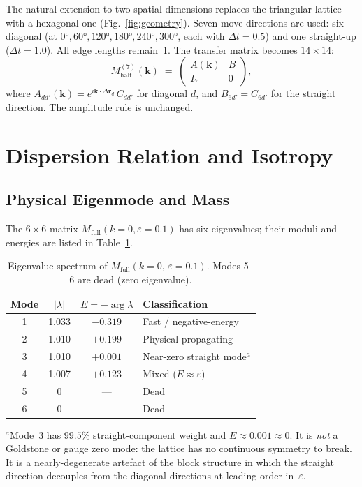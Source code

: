 \documentclass[twocolumn,showpacs,preprintnumbers,amsmath,amssymb]{revtex4-2}
\newcommand{\eps}{\varepsilon}
\begin{document}
The natural extension to two spatial dimensions replaces the triangular lattice
with a hexagonal one (Fig.~\ref{fig:geometry}).
Seven move directions are used: six diagonal (at $0°, 60°, 120°, 180°, 240°,
300°$, each with $\Delta t = 0.5$) and one straight-up ($\Delta t = 1.0$).
All edge lengths remain~1.  The transfer matrix becomes $14\times 14$:
\begin{equation}
  M_{\mathrm{half}}^{(7)}(\mathbf{k}) \;=\;
  \begin{pmatrix} A(\mathbf{k}) & B \\ I_7 & 0 \end{pmatrix},
  \label{eq:TM14}
\end{equation}
where $A_{dd'}(\mathbf{k}) = e^{i\mathbf{k}\cdot\Delta\mathbf{r}_d}\,C_{dd'}$
for diagonal $d$, and $B_{6d'} = C_{6d'}$ for the straight direction.
The amplitude rule is unchanged.

\section{Dispersion Relation and Isotropy}
\label{sec:dispersion}

\subsection{Physical Eigenmode and Mass}

The $6\times 6$ matrix $M_{\mathrm{full}}(k{=}0, \eps{=}0.1)$ has six
eigenvalues; their moduli and energies are listed in
Table~\ref{tab:spectrum}.

\begin{table}[t]
\caption{Eigenvalue spectrum of $M_{\mathrm{full}}(k{=}0,\,\eps{=}0.1)$.
Modes 5–6 are dead (zero eigenvalue).}
\label{tab:spectrum}
\begin{ruledtabular}
\begin{tabular}{cccl}
Mode & $|\lambda|$ & $E = -\arg\lambda$ & Classification \\
\hline
1 & 1.033 & $-0.319$ & Fast / negative-energy \\
2 & 1.010 & $+0.199$ & Physical propagating   \\
3 & 1.010 & $+0.001$ & Near-zero straight mode$^a$ \\
4 & 1.007 & $+0.123$ & Mixed ($E \approx \eps$) \\
5 & 0     & ---      & Dead                   \\
6 & 0     & ---      & Dead                   \\
\end{tabular}
\end{ruledtabular}
\noindent\small$^a$Mode~3 has $99.5\%$ straight-component weight and
$E \approx 0.001 \approx 0$. It is \emph{not} a Goldstone or gauge zero
mode: the lattice has no continuous symmetry to break.  It is a
nearly-degenerate artefact of the block structure in which the straight
direction decouples from the diagonal directions at leading order in~$\eps$.
\end{table}
\end{document}
